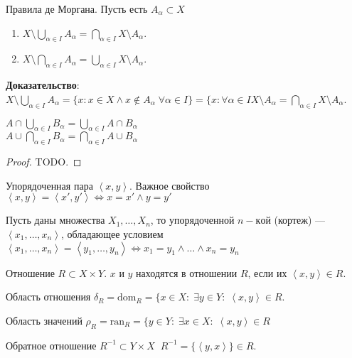 Правила де Моргана. Пусть есть $A_\alpha \subset X$
 \begin{enumerate}
     \item $X \setminus \bigcup_{\alpha \in I} A_\alpha = \bigcap_{\alpha \in I} X \setminus A_\alpha$.
     \item $X \setminus \bigcap_{\alpha \in I} A_\alpha = \bigcup_{\alpha \in I} X \setminus A_\alpha$.
\end{enumerate}
\textbf{Доказательство}: $X \setminus \bigcup_{\alpha \in I} A_{\alpha} = \{x: x \in X \land x \notin A_{\alpha} \; \forall \alpha \in I\} = \{x: \forall \alpha \in I X \setminus A_{\alpha} = \bigcap_{\alpha \in I} X \setminus A_{\alpha}$.
\begin{theorem}
    $A \cap \bigcup_{\alpha \in I} B_\alpha = \bigcup_{\alpha \in I} A \cap B_\alpha$\\
    $A \cup \bigcap_{\alpha \in I} B_\alpha = \bigcap_{\alpha \in I} A \cup B_\alpha$\\
\end{theorem}
\begin{proof}
    TODO.
\end{proof}
 \begin{definition}
    Упорядоченная пара $\left<x,y\right>$. Важное свойство $\left<x, y\right> = \left<x',y'\right> \iff x = x' \land y = y'$
\end{definition}
\begin{definition}
    Пусть даны множества $X_1,\ldots,X_n$, то упорядоченной $n-кой$ (кортеж) ---  $\left<x_1,\ldots,x_n\right>$, обладающее условием $\left<x_1,\ldots,x_n\right> = \left<y_1,\ldots,y_n\right> \iff x_1 = y_1 \land \ldots \land x_n = y_n$ 
\end{definition}
\begin{definition}
    Отношение $R \subset X \times Y$. $x$ и $y$ находятся в отношении $R$, если их $\left<x, y\right> \in R$.
\end{definition}
\begin{definition}
    Область отношения $\delta_R = \text{dom}_R = \{x \in X: \; \exists y \in Y: \; \left<x, y\right> \in R$.
\end{definition}
 \begin{definition}
     Область значений $\rho_R = \text{ran}_R = \{y \in Y: \; \exists x \in X: \; \left<x, y\right> \in R$
\end{definition}
\begin{definition}
    Обратное отношение $R^{-1} \subset Y \times X \; \; R^{-1} = \{\left<y,x\right>\} \in R$.
\end{definition}
